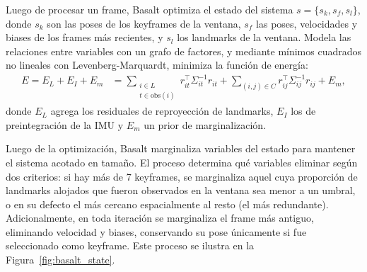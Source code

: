 Luego de procesar un frame, Basalt optimiza el estado del sistema $s = \{s_k, s_f, s_l\}$, donde $s_k$ son las poses de los keyframes de la ventana, $s_f$ las poses, velocidades y biases de los frames más recientes, y $s_l$ los landmarks de la ventana. Modela las relaciones entre variables con un grafo de factores, y mediante mínimos cuadrados no lineales con Levenberg-Marquardt, minimiza la función de energía:
\begin{align}
E = E_L + E_I + E_m
  &= \sum_{\substack{i \in L \\ t \in \text{obs}(i)}} r_{it}^\top \Sigma_{it}^{-1} r_{it}
   + \sum_{(i,j) \in C} r_{ij}^\top \Sigma_{ij}^{-1} r_{ij} + E_m,
\end{align}
donde $E_L$ agrega los residuales de reproyección de landmarks, $E_I$ los de preintegración de la IMU y $E_m$ un prior de marginalización.

Luego de la optimización, Basalt marginaliza variables del estado para mantener el sistema acotado en tamaño. El proceso determina qué variables eliminar según dos criterios: si hay más de 7 keyframes, se marginaliza aquel cuya proporción de landmarks alojados que fueron observados en la ventana sea menor a un umbral, o en su defecto el más cercano espacialmente al resto (el más redundante). Adicionalmente, en toda iteración se marginaliza el frame más antiguo, eliminando velocidad y biases, conservando su pose únicamente si fue seleccionado como keyframe. Este proceso se ilustra en la Figura~\ref{fig:basalt_state}.

